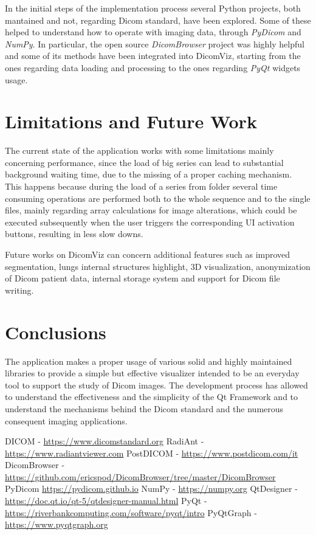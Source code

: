 \documentclass[conference]{IEEEtran}
\begin{document}
In the initial steps of the implementation process several Python projects, both mantained and not, regarding Dicom standard, have been explored. Some of these helped to understand how to operate with imaging data, through  \textit{PyDicom} and  \textit{NumPy}. In particular, the open source  \textit{DicomBrowser}\cite{b4} project was highly helpful and some of its methods have been integrated into DicomViz, starting from the ones regarding data loading and processing to the ones regarding  \textit{PyQt} widgets usage.

\section{Limitations and Future Work}
The current state of the application works with some limitations mainly concerning performance, since the load of big series can lead to substantial background waiting time, due to the missing of a proper caching mechanism. This happens because during the load of a series from folder several time consuming operations are performed both to the whole sequence and to the single files, mainly regarding array calculations for image alterations, which could be executed subsequently when the user triggers the corresponding UI activation buttons, resulting in less slow downs.

Future works on DicomViz can concern additional features such as improved segmentation, lungs internal structures highlight, 3D visualization,
anonymization of Dicom patient data, internal storage system and support for Dicom file writing.

\section{Conclusions}

The application makes a proper usage of various solid and highly maintained libraries to provide a simple but effective visualizer intended to be an everyday tool to support the study of Dicom images.
The development process has allowed to understand the effectiveness and the simplicity of the Qt Framework and to understand the mechanisms behind the Dicom standard and the numerous consequent imaging applications.



\begin{thebibliography}{00}

DICOM - \url{https://www.dicomstandard.org}
RadiAnt - \url{https://www.radiantviewer.com}
PostDICOM - \url{https://www.postdicom.com/it}
DicomBrowser - \url{https://github.com/ericspod/DicomBrowser/tree/master/DicomBrowser}
PyDicom \url{https://pydicom.github.io}
NumPy - \url{https://numpy.org}
QtDesigner - \url{https://doc.qt.io/qt-5/qtdesigner-manual.html}
PyQt - \url{https://riverbankcomputing.com/software/pyqt/intro}
PyQtGraph - \url{https://www.pyqtgraph.org}

\end{thebibliography}
\end{document}
